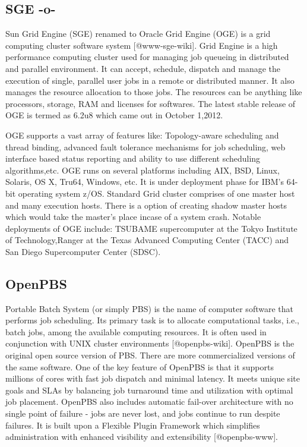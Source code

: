      
\subsection{SGE -o-}

Sun Grid Engine (SGE) renamed to Oracle Grid Engine (OGE) is a grid
computing cluster software system [@www-sge-wiki]. Grid Engine is
a high performance computing cluster used for managing job queueing in
distributed and parallel environment. It can accept, schedule,
dispatch and manage the execution of single, parallel user jobs in a
remote or distributed manner. It also manages the resource allocation
to those jobs. The resources can be anything like processors, storage,
RAM and licenses for softwares. The latest stable release of OGE is
termed as 6.2u8 which came out in October 1,2012.

OGE supports a vast array of features like: Topology-aware scheduling
and thread binding, advanced fault tolerance mechanisms for job
scheduling, web interface based status reporting and ability to use
different scheduling algorithms,etc. OGE runs on several platforms
including AIX, BSD, Linux, Solaris, OS X, Tru64, Windows, etc. It is
under deployment phase for IBM's 64-bit operating system
z/OS. Standard Grid cluster comprises of one master host and many
execution hosts. There is a option of creating shadow master hosts
which would take the master's place incase of a system crash. Notable
deployments of OGE include: TSUBAME supercomputer at the Tokyo
Institute of Technology,Ranger at the Texas Advanced Computing Center
(TACC) and San Diego Supercomputer Center (SDSC).



\subsection{OpenPBS}

Portable Batch System (or simply PBS) is the name of computer software
that performs job scheduling. Its primary task is to allocate
computational tasks, i.e., batch jobs, among the available computing
resources. It is often used in conjunction with UNIX cluster
environments [@openpbs-wiki]. OpenPBS is the original open source
version of PBS. There are more commercialized versions of the same
software. One of the key feature of OpenPBS is that it supports
millions of cores with fast job dispatch and minimal latency. It meets
unique site goals and SLAs by balancing job turnaround time and
utilization with optimal job placement. OpenPBS also includes
automatic fail-over architecture with no single point of failure -
jobs are never lost, and jobs continue to run despite failures. It is
built upon a Flexible Plugin Framework which simplifies administration
with enhanced visibility and extensibility [@openpbs-www].

